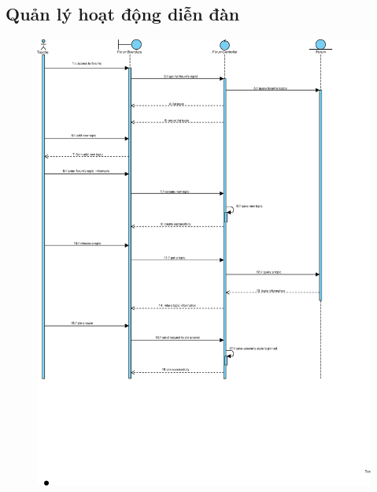 \documentclass[./../main_file.tex]{subfiles}
\begin{document}
	\subsection{Quản lý hoạt động diễn đàn}
	\begin{figure}[H]
		\centering
		\includegraphics[width=\linewidth]{./images/sequence_diagram/3_12_manage_forum.eps}
	\end{figure}
	
\end{document}
